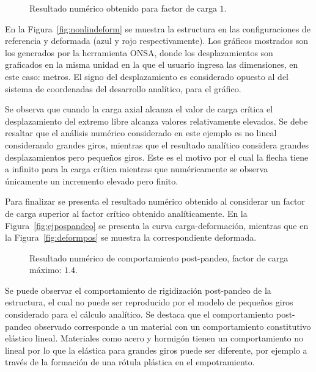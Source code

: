 \begin{figure}[htb]
	\centering
	\caption{Resultado numérico obtenido para factor de carga $1$.}
\end{figure}


En la Figura~\ref{fig:nonlindeform} se muestra la estructura en las configuraciones de referencia y deformada (azul y rojo respectivamente).
%
Los gráficos mostrados son los generados por la herramienta ONSA, donde los desplazamientos son graficados en la misma unidad en la que el usuario ingresa las dimensiones, en este caso: metros. %
%
El signo del desplazamiento es considerado opuesto al del sistema de coordenadas del desarrollo analítico, para el gráfico.


Se observa que cuando la carga axial alcanza el valor de carga crítica el desplazamiento del extremo libre alcanza valores relativamente elevados. %
%
Se debe resaltar que el análisis numérico considerado en este ejemplo es no lineal considerando grandes giros, mientras que el resultado analítico considera grandes desplazamientos pero pequeños giros. %
%
Este es el motivo por el cual la flecha tiene a infinito para la carga crítica mientras que numéricamente se observa únicamente un incremento elevado pero finito.

Para finalizar se presenta el resultado numérico obtenido al considerar un factor de carga superior al factor crítico obtenido analíticamente. %
%
En la Figura~\ref{fig:ejpospandeo} se presenta la curva carga-deformación, mientras que en la Figura~\ref{fig:deformpos} se muestra la correspondiente deformada.

\begin{figure}[htb]
	\centering
	\caption{Resultado numérico de comportamiento post-pandeo, factor de carga máximo: $1.4$.}
\end{figure}

Se puede observar el comportamiento de rigidización post-pandeo de la estructura, el cual no puede ser reproducido por el modelo de pequeños giros considerado para el cálculo analítico. %
%
Se destaca que el comportamiento post-pandeo observado corresponde a un material con un comportamiento constitutivo elástico lineal. Materiales como acero y hormigón tienen un comportamiento no lineal por lo que la elástica para grandes giros puede ser diferente, por ejemplo a través de la formación de una rótula plástica en el empotramiento.